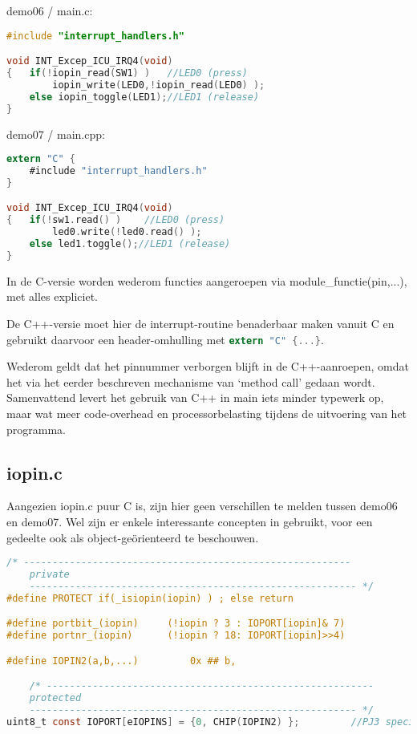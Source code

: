 \documentclass[a4paper, 11pt, fleqn, twoside]{scrartcl}%
\begin{document}
demo06 / main.c:
\begin{lstlisting}[language=C,backgroundcolor=\color{orange!10},framerule=0pt,columns=fixed]
#include "interrupt_handlers.h"

void INT_Excep_ICU_IRQ4(void)
{	if(!iopin_read(SW1) )	//LED0 (press)
		iopin_write(LED0,!iopin_read(LED0) );
	else iopin_toggle(LED1);//LED1 (release)
}
\end{lstlisting}
demo07 / main.cpp:
\begin{lstlisting}[language=C,backgroundcolor=\color{orange!10},framerule=0pt,columns=fixed]
extern "C" {
	#include "interrupt_handlers.h"
}

void INT_Excep_ICU_IRQ4(void)
{	if(!sw1.read() )	//LED0 (press)
		led0.write(!led0.read() );
	else led1.toggle();//LED1 (release)
}
\end{lstlisting}

In de C-versie worden wederom functies aangeroepen via module\_functie(pin,...),
met alles expliciet.

De C++-versie moet hier de interrupt-routine benaderbaar maken vanuit C en
gebruikt daarvoor een header-omhulling met 
\lstinline[language=C]!extern "C" {...}!.

Wederom geldt dat het pinnummer verborgen blijft in de C++-aanroepen, omdat het 
via het eerder beschreven mechanisme van `method call' gedaan wordt.\\

Samenvattend levert het gebruik van C++ in main iets minder typewerk op,
maar wat meer code-overhead en processorbelasting tijdens de uitvoering van 
het programma.

\subsection{iopin.c}
Aangezien iopin.c puur C is, zijn hier geen verschillen te melden tussen demo06
en demo07. Wel zijn er enkele interessante concepten in gebruikt, voor een
gedeelte ook als object-ge\"orienteerd te beschouwen.

\begin{lstlisting}[language=C,backgroundcolor=\color{orange!10},framerule=0pt,columns=fixed]
	/* ---------------------------------------------------------
	private
	--------------------------------------------------------- */
#define PROTECT	if(_isiopin(iopin) ) ; else return

#define portbit_(iopin)		(!iopin ? 3 : IOPORT[iopin]& 7)
#define portnr_(iopin)		(!iopin ? 18: IOPORT[iopin]>>4)

#define IOPIN2(a,b,...)			0x ## b,

	/* ---------------------------------------------------------
	protected
	--------------------------------------------------------- */
uint8_t const IOPORT[eIOPINS] = {0, CHIP(IOPIN2) };			//PJ3 special
\end{lstlisting}
\end{document}
